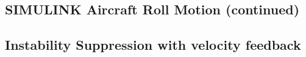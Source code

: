 \documentclass[12pt,letter]{article}
\begin{document}
\subsection{SIMULINK Aircraft Roll Motion (continued)}


\subsection{Instability Suppression with velocity feedback}




	\pagebreak
	\renewcommand{\thepage}{}
	\renewcommand\refname{References Cited}
	\pagestyle{plain}
	
	
\end{document}
